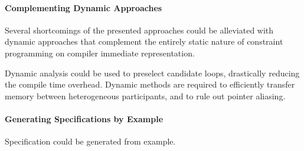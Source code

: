     \paragraph*{Complementing Dynamic Approaches}
    Several shortcomings of the presented approaches could be alleviated with
    dynamic approaches that complement the entirely static nature of constraint
    programming on compiler immediate representation.

    Dynamic analysis could be used to preselect candidate loops, drastically
    reducing the compile time overhead.
    Dynamic methods are required to efficiently transfer memory between
    heterogeneous participants, and to rule out pointer aliasing.

    \paragraph*{Generating Specifications by Example}
    Specification could be generated from example.
    



